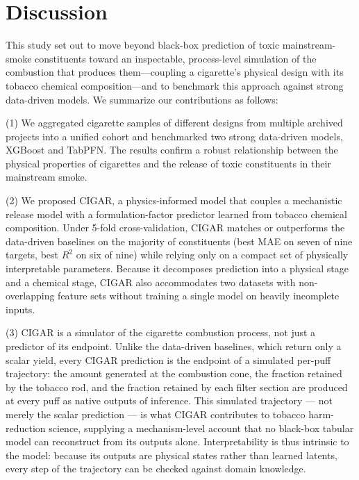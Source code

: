 ﻿\documentclass[a4paper,fleqn]{cas-sc}
\begin{document}

\section{Discussion}

This study set out to move beyond black-box prediction of toxic mainstream-smoke constituents toward an inspectable, process-level simulation of the combustion that produces them---coupling a cigarette's physical design with its tobacco chemical composition---and to benchmark this approach against strong data-driven models. We summarize our contributions as follows:

(1) We aggregated cigarette samples of different designs from multiple archived projects into a unified cohort and benchmarked two strong data-driven models, XGBoost and TabPFN. The results confirm a robust relationship between the physical properties of cigarettes and the release of toxic constituents in their mainstream smoke.

(2) We proposed CIGAR, a physics-informed model that couples a mechanistic release model with a formulation-factor predictor learned from tobacco chemical composition. Under 5-fold cross-validation, CIGAR matches or outperforms the data-driven baselines on the majority of constituents (best MAE on seven of nine targets, best $R^2$ on six of nine) while relying only on a compact set of physically interpretable parameters. Because it decomposes prediction into a physical stage and a chemical stage, CIGAR also accommodates two datasets with non-overlapping feature sets without training a single model on heavily incomplete inputs.

(3) CIGAR is a simulator of the cigarette combustion process, not just a predictor of its endpoint. Unlike the data-driven baselines, which return only a scalar yield, every CIGAR prediction is the endpoint of a simulated per-puff trajectory: the amount generated at the combustion cone, the fraction retained by the tobacco rod, and the fraction retained by each filter section are produced at every puff as native outputs of inference. This simulated trajectory --- not merely the scalar prediction --- is what CIGAR contributes to tobacco harm-reduction science, supplying a mechanism-level account that no black-box tabular model can reconstruct from its outputs alone. Interpretability is thus intrinsic to the model: because its outputs are physical states rather than learned latents, every step of the trajectory can be checked against domain knowledge.
\end{document}
